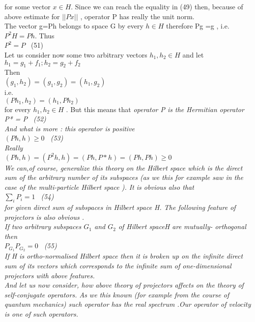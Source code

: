\documentclass[a4paper,12pt] {article}
\begin{document}
{ for some vector $ x\in H $. Since we can reach the equality  in (49) then, because of above estimate for
  $\vert  \vert Px\vert \vert $ , operator P has really the unit norm.\\ The  vector g=Ph belongs to space
G by every  $ h\in H $  therefore Pg =g , i.e. $  P^2 H = Ph$. Thus \\$ P^2 =P$ \ (51)\\ Let us consider now
some two  arbitrary vectors $ h_1, h_2 \in H $ and let \\$ h_1 = g_1+f_1 ;   h_2 = g_2+f_2 $  \\Then \\
 $ (g_1, h_2) = (g_1, g_2) =(h_1, g_2) $ \\ i.e. \\ $ (Ph_1, h_2)=(h_1, Ph_2) $\\ for every $  h_1, h_2 \in H
$ . But this means that  \it operator P  \it is the Hermitian   operator \rm \\ P* = P \ (52) \\ And what is
 more :{ \it  this operator is positive} \\$ (Ph,h )\geq 0 $ \ (53) \\ Really \\$  (Ph,h ) =  (P^2h,h )= (Ph,P*h ) = (Ph,Ph )  \geq 0 $
 \\ We can,of course, generalize this theory on the Hilbert space which is the direct sum of the arbitrary
 number of its  subspaces (as we this for example saw in the case of the  multi-particle
 Hilbert space  ). It is obvious also that \\$ \sum _i P_i =1 $ \ (54)\\ for given direct sum of subspaces in
Hilbert space H. The following feature of projectors is also obvious .\\ \it If two arbitrary subspaces
  $ G_1$  \it and  $ G_2$ \it  of Hilbert space\rm   H  \it are mutually- orthogonal then
 \\$ P_{G_1} P_{G_2} =0 $  \rm \ (55) \\ If H is  ortho-normalised  Hilbert space then it is broken up on
the  \it infinite direct sum of its vectors \rm  which corresponds to \it the infinite sum of one-dimensional
 projectors with above features.\\
\rm And let us now consider, how above theory of projectors affects on the  \it theory of self-conjugate
 operators. \rm As we this known (for example from the course of quantum mechanics) such operator
 \it   has the real spectrum .\rm  Our operator of velocity is one of such operators.\\
}
\end{document}
